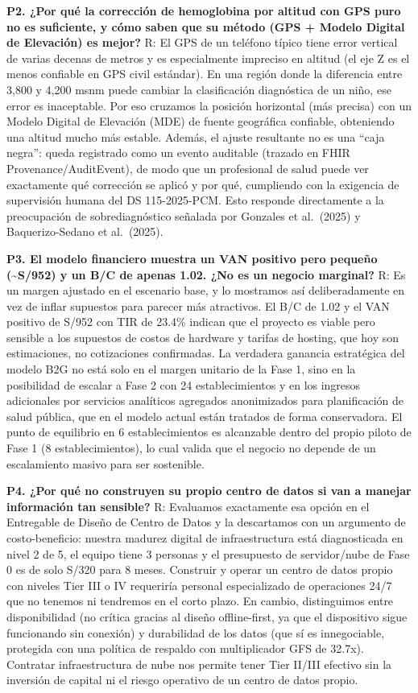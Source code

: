 \documentclass[11pt,a4paper]{article}
\begin{document}
\textbf{P2. ¿Por qué la corrección de hemoglobina por altitud con GPS puro no es suficiente, y cómo saben que su método (GPS + Modelo Digital de Elevación) es mejor?}
R: El GPS de un teléfono típico tiene error vertical de varias decenas de metros y es especialmente impreciso en altitud (el eje Z es el menos confiable en GPS civil estándar). En una región donde la diferencia entre 3,800 y 4,200 msnm puede cambiar la clasificación diagnóstica de un niño, ese error es inaceptable. Por eso cruzamos la posición horizontal (más precisa) con un Modelo Digital de Elevación (MDE) de fuente geográfica confiable, obteniendo una altitud mucho más estable. Además, el ajuste resultante no es una ``caja negra'': queda registrado como un evento auditable (trazado en FHIR Provenance/AuditEvent), de modo que un profesional de salud puede ver exactamente qué corrección se aplicó y por qué, cumpliendo con la exigencia de supervisión humana del DS 115-2025-PCM. Esto responde directamente a la preocupación de sobrediagnóstico señalada por Gonzales et al.~(2025) y Baquerizo-Sedano et al.~(2025).

\textbf{P3. El modelo financiero muestra un VAN positivo pero pequeño (\textasciitilde S/952) y un B/C de apenas 1.02. ¿No es un negocio marginal?}
R: Es un margen ajustado en el escenario base, y lo mostramos así deliberadamente en vez de inflar supuestos para parecer más atractivos. El B/C de 1.02 y el VAN positivo de S/952 con TIR de 23.4\% indican que el proyecto es viable pero sensible a los supuestos de costos de hardware y tarifas de hosting, que hoy son estimaciones, no cotizaciones confirmadas. La verdadera ganancia estratégica del modelo B2G no está solo en el margen unitario de la Fase 1, sino en la posibilidad de escalar a Fase 2 con 24 establecimientos y en los ingresos adicionales por servicios analíticos agregados anonimizados para planificación de salud pública, que en el modelo actual están tratados de forma conservadora. El punto de equilibrio en 6 establecimientos es alcanzable dentro del propio piloto de Fase 1 (8 establecimientos), lo cual valida que el negocio no depende de un escalamiento masivo para ser sostenible.

\textbf{P4. ¿Por qué no construyen su propio centro de datos si van a manejar información tan sensible?}
R: Evaluamos exactamente esa opción en el Entregable de Diseño de Centro de Datos y la descartamos con un argumento de costo-beneficio: nuestra madurez digital de infraestructura está diagnosticada en nivel 2 de 5, el equipo tiene 3 personas y el presupuesto de servidor/nube de Fase 0 es de solo S/320 para 8 meses. Construir y operar un centro de datos propio con niveles Tier III o IV requeriría personal especializado de operaciones 24/7 que no tenemos ni tendremos en el corto plazo. En cambio, distinguimos entre disponibilidad (no crítica gracias al diseño offline-first, ya que el dispositivo sigue funcionando sin conexión) y durabilidad de los datos (que sí es innegociable, protegida con una política de respaldo con multiplicador GFS de 32.7x). Contratar infraestructura de nube nos permite tener Tier II/III efectivo sin la inversión de capital ni el riesgo operativo de un centro de datos propio.
\end{document}

